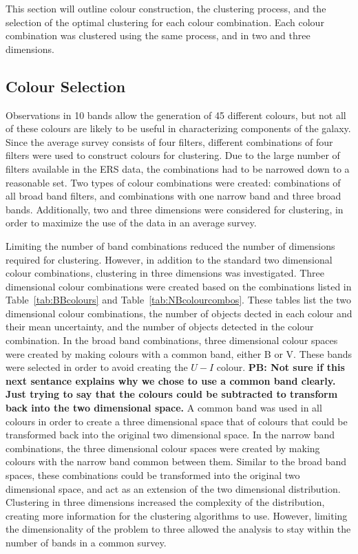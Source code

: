 This section will outline colour construction, the clustering process, and the selection of the optimal clustering for each colour combination.
Each colour combination was clustered using the same process, and in two and three dimensions.

\subsection{Colour Selection}

Observations in 10 bands allow the generation of 45 different colours, but not all of these colours are likely to be useful in characterizing components of the galaxy.
Since the average survey consists of four filters, different combinations of four filters were used to construct colours for clustering. 
Due to the large number of filters available in the ERS data, the combinations had to be narrowed down to a reasonable set.
Two types of colour combinations were created: combinations of all broad band filters, and combinations with one narrow band and three broad bands.
Additionally, two and three dimensions were considered for clustering, in order to maximize the use of the data in an average survey.

Limiting the number of band combinations reduced the number of dimensions required for clustering.
However, in addition to the standard two dimensional colour combinations, clustering in three dimensions was investigated.
Three dimensional colour combinations were created based on the combinations listed in Table~\ref{tab:BBcolours} and Table~\ref{tab:NBcolourcombos}.
These tables list the two dimensional colour combinations, the number of objects dected in each colour and their mean uncertainty, and the number of objects detected in the colour combination.
In the broad band combinations, three dimensional colour spaces were created by making colours with a common band, either B or V.
These bands were selected in order to avoid creating the $U - I$ colour.
\textbf{PB: Not sure if this next sentance explains why we chose to use a common band clearly. Just trying to say that the colours could be subtracted to transform back into the two dimensional space.}
A common band was used in all colours in order to create a three dimensional space that of colours that could be transformed back into the original two dimensional space. 
In the narrow band combinations, the three dimensional colour spaces were created by making colours with the narrow band common between them.
Similar to the broad band spaces, these combinations could be transformed into the original two dimensional space, and act as an extension of the two dimensional distribution.
Clustering in three dimensions increased the complexity of the distribution, creating more information for the clustering algorithms to use.
However, limiting the dimensionality of the problem to three allowed the analysis to stay within the number of bands in a common survey.

